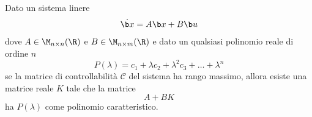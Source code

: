 \begin{thm}

    Dato un sistema linere
    \begin{equation}
        \dot {\b x} = A\b x + B \b u
        \label{eq:sistema-lineare-controllabile}
    \end{equation}
    dove $A \in \M_{n\times n}(\R)$ e $B \in \M_{n\times m}(\R)$
    e dato un qualsiasi polinomio reale di ordine $n$
    \begin{equation*}
        P(\lambda) = c_1 + \lambda c_2 + \lambda^2 c_3 + \ldots + \lambda^n
    \end{equation*}
    se la matrice di controllabilità $\mathcal C$ del sistema ha rango massimo,
    allora esiste una matrice reale $K$ tale che la matrice
    \begin{equation*}
        A + BK
    \end{equation*}
    ha $P(\lambda)$ come polinomio caratteristico.

    \label{thm:eigenvalue-placement}
\end{thm}

